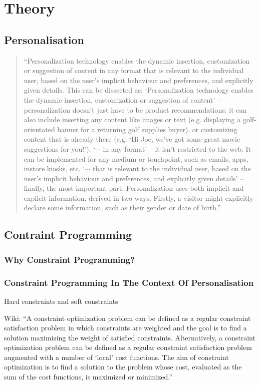 \chapter{Theory} %
\label{ch:theory}

\section{Personalisation}
\begin{quotation}
	``Personalization technology enables the dynamic insertion, customization or suggestion of content in any format that is relevant to the individual user, based on the user’s implicit behaviour and preferences, and explicitly given details.
	This can be dissected as:
	`Personalization technology enables the dynamic insertion, customization or suggestion of content' – personalization doesn’t just have to be product recommendations: it can also include inserting any content like images or text (e.g. displaying a golf-orientated banner for a returning golf supplies buyer), or customizing content that is already there (e.g. `Hi Joe, we've got some great movie suggestions for you!').
	`$\cdots$ in any format' – it isn’t restricted to the web. It can be implemented for any medium or touchpoint, such as emails, apps, instore kiosks, etc.
	`$\cdots$ that is relevant to the individual user, based on the user's implicit behaviour and preferences, and explicitly given details' – finally, the most important part. Personalization uses both implicit and explicit information, derived in two ways. Firstly, a visitor might explicitly declare some information, such as their gender or date of birth.''
\end{quotation}



\section{Contraint Programming}
\subsection{Why Constraint Programming?}
\subsection{Constraint Programming In The Context Of Personalisation}
Hard constraints and soft constraints


Wiki: ``A constraint optimization problem can be defined as a regular constraint satisfaction problem in which constraints are weighted and the goal is to find a solution maximizing the weight of satisfied constraints.
Alternatively, a constraint optimization problem can be defined as a regular constraint satisfaction problem augmented with a number of `local' cost functions. The aim of constraint optimization is to find a solution to the problem whose cost, evaluated as the sum of the cost functions, is maximized or minimized.''





